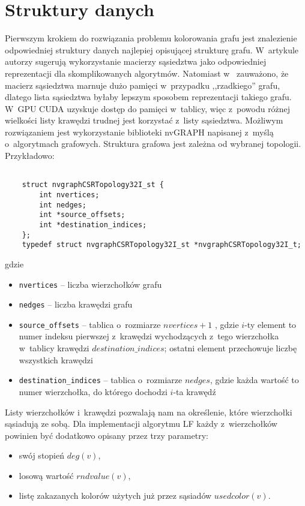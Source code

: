 \documentclass{article}
\begin{document}
  


 
	\section{Struktury danych}
	Pierwszym krokiem do rozwiązania problemu kolorowania grafu jest znalezienie odpowiedniej struktury danych najlepiej opisującej strukturę grafu. W~artykule \cite{Shen2017} autorzy sugerują wykorzystanie macierzy sąsiedztwa jako odpowiedniej reprezentacji dla skomplikowanych algorytmów. Natomiast w~\cite{SINGH20155} zauważono, że macierz sąsiedztwa marnuje dużo pamięci w~przypadku ,,rzadkiego'' grafu, dlatego lista sąsiedztwa byłaby lepszym sposobem reprezentacji takiego grafu. W~GPU CUDA uzyskuje dostęp do pamięci w~tablicy, więc z~powodu różnej wielkości listy krawędzi trudnej jest korzystać z~listy sąsiedztwa. Możliwym rozwiązaniem jest wykorzystanie biblioteki nvGRAPH napisanej z~myślą o~algorytmach grafowych. Struktura grafowa jest zależna od wybranej topologii. Przykładowo:
	\begin{lstlisting}
	
	struct nvgraphCSRTopology32I_st {
		int nvertices;
		int nedges;
		int *source_offsets;
		int *destination_indices;
	};
	typedef struct nvgraphCSRTopology32I_st *nvgraphCSRTopology32I_t;
	\end{lstlisting}
	gdzie
	\begin{itemize}
		\itemsep0em
		\item \texttt{nvertices} -- liczba wierzchołków grafu
		\item \texttt{nedges} -- liczba krawędzi grafu
		\item \texttt{source\_offsets} -- tablica o~rozmiarze $nvertices+1$ , gdzie $i$-ty element to numer indeksu pierwszej z~krawędzi wychodzących z~tego wierzchołka w~tablicy krawędzi $destination\_indices$; ostatni element przechowuje liczbę wszystkich krawędzi
		\item \texttt{destination\_indices} -- tablica o~rozmiarze $nedges$, gdzie każda wartość to numer wierzchołka, do którego dochodzi $i$-ta krawędź
	\end{itemize}
	Listy wierzchołków i~krawędzi pozwalają nam na określenie, które wierzchołki sąsiadują ze sobą. Dla implementacji algorytmu LF każdy z~wierzchołków powinien być dodatkowo opisany przez trzy parametry:
	\begin{itemize}
		\itemsep0em
		\item swój stopień $deg(v)$,
		\item losową wartość $rndvalue(v)$, 
		\item listę zakazanych kolorów użytych już przez sąsiadów $usedcolor(v)$. 
	\end{itemize}
\end{document}

